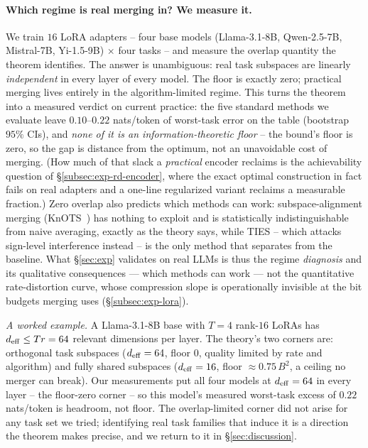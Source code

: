 \paragraph{Which regime is real merging in? We measure it.} We train
$16$ LoRA adapters -- four base models (Llama-3.1-8B, Qwen-2.5-7B,
Mistral-7B, Yi-1.5-9B) $\times$ four tasks -- and measure the overlap
quantity the theorem identifies. The answer is unambiguous: real task
subspaces are linearly \emph{independent} in every layer of every
model. The floor is exactly zero; practical merging lives entirely in
the algorithm-limited regime. This turns the theorem into a measured
verdict on current practice: the five standard methods we evaluate
leave $0.10$--$0.22$ nats/token of worst-task error on the table
(bootstrap $95\%$ CIs), and \emph{none of it is an
information-theoretic floor} -- the bound's floor is zero, so the gap
is distance from the optimum, not an unavoidable cost of merging. (How much of that slack a \emph{practical} encoder
reclaims is the achievability question of
\S\ref{subsec:exp-rd-encoder}, where the exact optimal construction
in fact fails on real adapters and a one-line regularized variant
reclaims a measurable fraction.) Zero overlap also predicts which
methods can work: subspace-alignment merging
(KnOTS~\cite{stoica2025knots}) has nothing to exploit and is
statistically indistinguishable from naive averaging, exactly as the
theory says, while TIES -- which attacks sign-level interference
instead -- is the only method that separates from the baseline. What
\S\ref{sec:exp} validates on real LLMs is thus the regime
\emph{diagnosis} and its qualitative consequences --- which methods
can work --- not the quantitative rate-distortion curve, whose
compression slope is operationally invisible at the bit budgets
merging uses (\S\ref{subsec:exp-lora}).

\emph{A worked example.} A Llama-3.1-8B base with $T{=}4$ rank-$16$
LoRAs has $d_{\mathrm{eff}} \leq Tr = 64$ relevant dimensions per layer. The
theory's two corners are: orthogonal task subspaces ($d_{\mathrm{eff}} = 64$,
floor $0$, quality limited by rate and algorithm) and fully shared
subspaces ($d_{\mathrm{eff}} = 16$, floor $\approx 0.75\,B^2$, a ceiling no
merger can break). Our measurements put all four models at
$d_{\mathrm{eff}} = 64$ in every layer -- the floor-zero corner -- so this
model's measured worst-task excess of $0.22$ nats/token is headroom,
not floor. The overlap-limited corner did not arise for any task set
we tried; identifying real task families that induce it is a
direction the theorem makes precise, and we return to it in
\S\ref{sec:discussion}.

